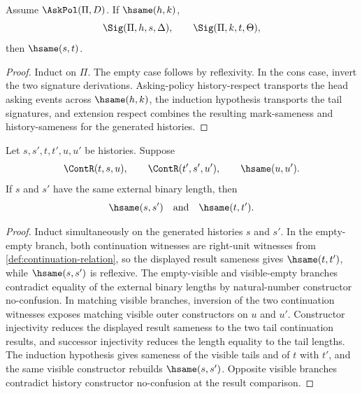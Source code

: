 \begin{theorem}
\label{thm:signature-generation-respects-source-hsame}
Assume $\AskPol(\Pi,D)$. If $\hsame(h,k)$,
$$
\Sig(\Pi,h,s,\Delta),
\qquad
\Sig(\Pi,k,t,\Theta),
$$
then $\hsame(s,t)$.
\end{theorem}
\begin{proof}
Induct on $\Pi$. The empty case follows by reflexivity. In the cons case, invert the two signature derivations. Asking-policy history-respect transports the head asking events across $\hsame(h,k)$, the induction hypothesis transports the tail signatures, and extension respect combines the resulting mark-sameness and history-sameness for the generated histories.
\end{proof}

\begin{lemma}
\label{lem:continuation-fixed-length-split-uniqueness}
Let $s,s',t,t',u,u'$ be histories. Suppose
$$
\ContR(t,s,u),
\qquad
\ContR(t',s',u'),
\qquad
\hsame(u,u').
$$
If $s$ and $s'$ have the same external binary length, then
$$
\hsame(s,s')
\quad\text{and}\quad
\hsame(t,t').
$$
\end{lemma}
\begin{proof}
Induct simultaneously on the generated histories $s$ and $s'$. In the
empty-empty branch, both continuation witnesses are right-unit witnesses from
\autoref{def:continuation-relation}, so the displayed result sameness gives
$\hsame(t,t')$, while $\hsame(s,s')$ is reflexive. The empty-visible and
visible-empty branches contradict equality of the external binary lengths by
natural-number constructor no-confusion. In matching visible branches, inversion
of the two continuation witnesses exposes matching visible outer constructors
on $u$ and $u'$. Constructor injectivity reduces the displayed result sameness
to the two tail continuation results, and successor injectivity reduces the
length equality to the tail lengths. The induction hypothesis gives sameness of
the visible tails and of $t$ with $t'$, and the same visible constructor rebuilds
$\hsame(s,s')$. Opposite visible branches contradict history constructor
no-confusion at the result comparison.
\end{proof}


